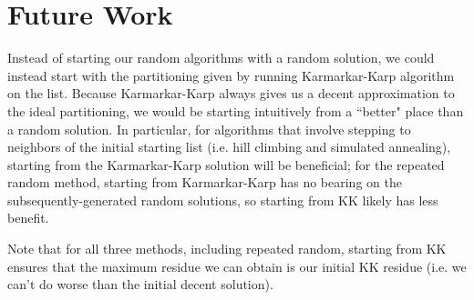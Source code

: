 \documentclass[a4paper]{article}
\begin{document}
	
	\section{Future Work}
	
	Instead of starting our random algorithms with a random solution, we could instead start with the partitioning given by running Karmarkar-Karp algorithm on the list. Because Karmarkar-Karp always gives us a decent approximation to the ideal partitioning, we would be starting intuitively from a ``better" place than a random solution. In particular, for algorithms that involve stepping to neighbors of the initial starting list (i.e. hill climbing and simulated annealing), starting from the Karmarkar-Karp solution will be beneficial; for the repeated random method, starting from Karmarkar-Karp has no bearing on the subsequently-generated random solutions, so starting from KK likely has less benefit.
	
	Note that for all three methods, including repeated random, starting from KK ensures that the maximum residue we can obtain is our initial KK residue (i.e. we can't do worse than the initial decent solution).
	
\end{document}
